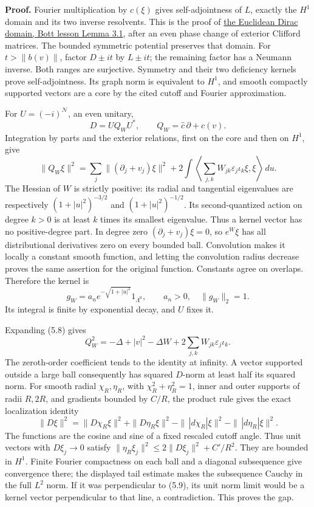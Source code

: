 \documentclass[
  11pt,
]{article}
\begin{document}
\textbf{Proof.} Fourier multiplication by \(c(\xi)\) gives
self-adjointness of \(L\), exactly the \(H^1\) domain and its two
inverse resolvents. This is the proof of
\href{KT-KK-12.html\#3-differentiation-on-euclidean-space}{the Euclidean
Dirac domain, Bott lesson Lemma 3.1}, after an even phase change of
exterior Clifford matrices. The bounded symmetric potential preserves
that domain. For \(t>\|b(v)\|\), factor \(D\pm it\) by \(L\pm it\); the
remaining factor has a Neumann inverse. Both ranges are surjective.
Symmetry and their two deficiency kernels prove self-adjointness. Its
graph norm is equivalent to \(H^1\), and smooth compactly supported
vectors are a core by the cited cutoff and Fourier approximation.

For \(U=(-i)^{\mathcal N}\), an even unitary, \[
D=UQ_WU^*,\qquad Q_W=\widehat c\,\partial+c(v).
\tag{5.7}
\] Integration by parts and the exterior relations, first on the core
and then on \(H^1\), give \[
\|Q_W\xi\|^2=\sum_j\|(\partial_j+v_j)\xi\|^2+
2\int\left\langle\sum_{j,k}W_{jk}\varepsilon_j\iota_k\xi,\xi\right\rangle\,du.
\tag{5.8}
\] The Hessian of \(W\) is strictly positive: its radial and tangential
eigenvalues are respectively \((1+|u|^2)^{-3/2}\) and
\((1+|u|^2)^{-1/2}\). Its second-quantized action on degree \(k>0\) is
at least \(k\) times its smallest eigenvalue. Thus a kernel vector has
no positive-degree part. In degree zero \((\partial_j+v_j)\xi=0\), so
\(e^W\xi\) has all distributional derivatives zero on every bounded
ball. Convolution makes it locally a constant smooth function, and
letting the convolution radius decrease proves the same assertion for
the original function. Constants agree on overlaps. Therefore the kernel
is \[
g_W=a_n e^{-\sqrt{1+|u|^2}}1_{\Lambda^0},\qquad a_n>0,\quad\|g_W\|_2=1.
\tag{5.9}
\] Its integral is finite by exponential decay, and \(U\) fixes it.

Expanding (5.8) gives \[
Q_W^2=-\Delta+|v|^2-\Delta W+2\sum_{j,k}W_{jk}\varepsilon_j\iota_k.
\tag{5.10}
\] The zeroth-order coefficient tends to the identity at infinity. A
vector supported outside a large ball consequently has squared
\(D\)-norm at least half its squared norm. For smooth radial
\(\chi_R,\eta_R\), with \(\chi_R^2+\eta_R^2=1\), inner and outer
supports of radii \(R,2R\), and gradients bounded by \(C/R\), the
product rule gives the exact localization identity \[
\|D\xi\|^2=\|D\chi_R\xi\|^2+\|D\eta_R\xi\|^2
-\|\,|d\chi_R|\xi\|^2-\|\,|d\eta_R|\xi\|^2.
\tag{5.11}
\] The functions are the cosine and sine of a fixed rescaled cutoff
angle. Thus unit vectors with \(D\xi_j\to0\) satisfy
\(\|\eta_R\xi_j\|^2\leq2\|D\xi_j\|^2+C'/R^2\). They are bounded in
\(H^1\). Finite Fourier compactness on each ball and a diagonal
subsequence give convergence there; the displayed tail estimate makes
the subsequence Cauchy in the full \(L^2\) norm. If it was perpendicular
to (5.9), its unit norm limit would be a kernel vector perpendicular to
that line, a contradiction. This proves the gap.
\end{document}
